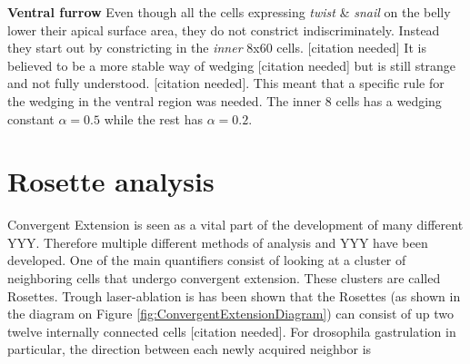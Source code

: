 \textbf{Ventral furrow}
Even though all the cells expressing \textit{twist} \& \textit{snail} on the belly lower their apical surface area, they do not constrict indiscriminately. Instead they start out by constricting in the \textit{inner} 8x60 cells. [citation needed] It is believed to be a more stable way of wedging [citation needed] but is still strange and not fully understood. [citation needed]. This meant that a specific rule for the wedging in the ventral region was needed. The inner 8 cells has a wedging constant $\alpha = 0.5$ while the rest has $\alpha = 0.2$.

\section*{Rosette analysis}
Convergent Extension is seen as a vital part of the development of many different YYY. Therefore multiple different methods of analysis and YYY have been developed.
One of the main quantifiers consist of looking at a cluster of neighboring cells that undergo convergent extension. These clusters are called Rosettes. Trough laser-ablation is has been shown that the Rosettes (as shown in the diagram on Figure \ref{fig:ConvergentExtensionDiagram}) can consist of up two twelve internally connected cells [citation needed].
For drosophila gastrulation in particular, the direction between each newly acquired neighbor is 





